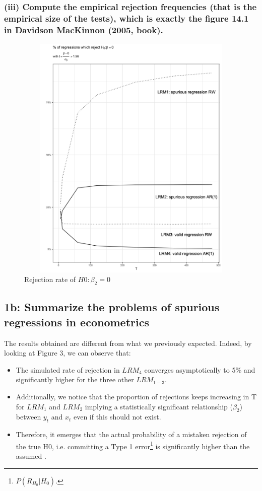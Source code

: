 \documentclass[]{article}
\newcommand{\commentTP}[2]{\comment[id=tp]{#2}{#1}}
\begin{document}
\newpage
\subsubsection*{(iii) Compute the empirical rejection frequencies (that is the empirical size of the tests), which is exactly the figure 14.1 in Davidson MacKinnon (2005, book).}

\begin{figure}[H]
	\centering
	\includegraphics[width=14cm, height=12cm]{"./1aiii_chart"}
	\caption[]{Rejection rate of $H0: \beta_2=0$}
\end{figure}

\newpage
\subsection*{1b: Summarize the problems of spurious regressions in econometrics}

The results obtained are different from what we previously expected. Indeed, by looking at Figure 3, we can observe that:
\begin{itemize}
	\item The simulated rate of rejection in $LRM_4$ converges asymptotically to 5\% and significantly higher for the three other $LRM_{1-3}$.
	\item Additionally, we notice that the proportion of rejections keeps increasing in T for $LRM_1$ and $LRM_2$ implying a statistically significant relationship ($\beta_2$) between $y_t$ and $x_t$ even if this should not exist.
	\item Therefore, it emerges that the actual probability of a mistaken rejection of the true H0, i.e. committing a Type 1 error\footnote{$P(R_{H_0}|H_0)$.} is significantly higher than the assumed \commentTP{test size}{T?}.
\end{itemize}
\end{document}

